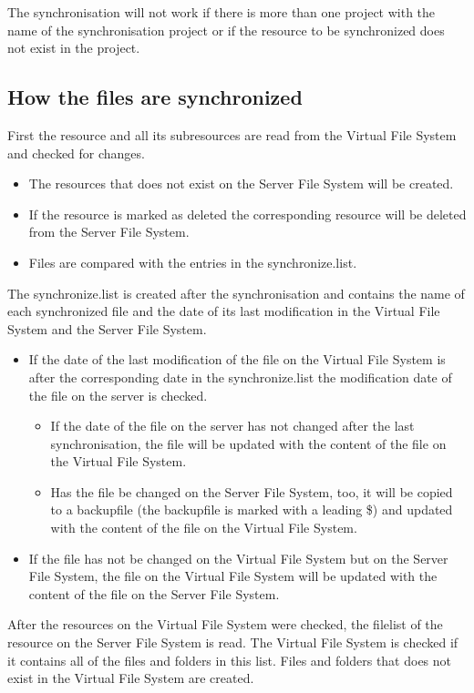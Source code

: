 The synchronisation will not work if there is more than one project with the name of the synchronisation project or if the resource to be synchronized does not exist in the project.

\subsection{How the files are synchronized}
First the resource and all its subresources are read from the Virtual File System and checked for changes.

\begin{itemize}
\item The resources that does not exist on the Server File System will be created.
\item If the resource is marked as deleted the corresponding resource will be deleted from the Server File System.
\item Files are compared with the entries in the {\dir synchronize.list}.
\end{itemize}

The {\dir synchronize.list} is created after the synchronisation and contains the name of each synchronized file and the date of its last modification in the Virtual File System and the Server File System.

\begin{itemize}
\item If the date of the last modification of the file on the Virtual File System is after the corresponding date in the {\dir synchronize.list} the modification date of the file on the server is checked.
    \begin{itemize}
    \item If the date of the file on the server has not changed after the last synchronisation, the file will be updated with the content of the file on the Virtual File System.
    \item Has the file be changed on the Server File System, too, it will be copied to a backupfile (the backupfile is marked with a leading {\name \$}) and updated with the content of the file on the Virtual File System.
    \end{itemize}
\item If the file has not be changed on the Virtual File System but on the Server File System, the file on the Virtual File System will be updated with the content of the file on the Server File System.
\end{itemize}

After the resources on the Virtual File System were checked, the filelist of the resource on the Server File System is read. The Virtual File System is checked if it contains all of the files and folders in this list. Files and folders that does not exist in the Virtual File System are created.

